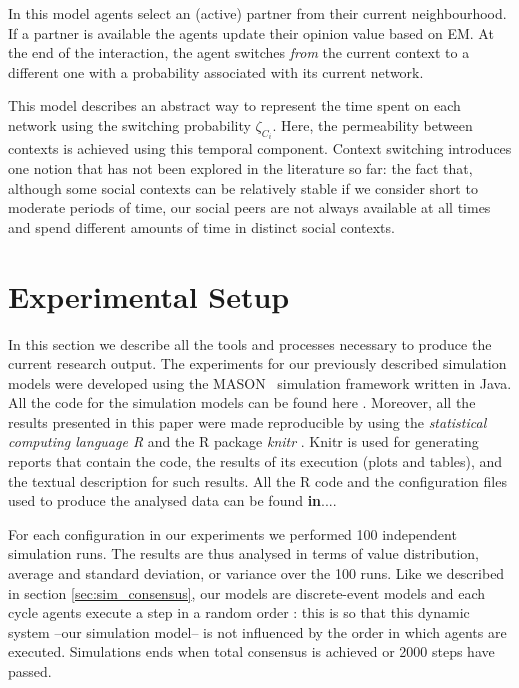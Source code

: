 \documentclass[preprint,number]{elsarticle}
\begin{document}
	\noindent In this model agents select an (active) partner from their current neighbourhood. If a partner is available the agents update their opinion value based on EM. At the end of the interaction, the agent switches \textit{from} the current context to a different one with a probability associated with its current network. 
	
	This model describes an abstract way to represent the time spent on each network using the switching probability $\zeta_{C_i}$. Here, the permeability between contexts is achieved using this temporal component. Context switching introduces one notion that has not been explored in the literature so far: the fact that, although some social contexts can be relatively stable if we consider short to moderate periods of time, our social peers are not always available at all times and spend different amounts of time in distinct social contexts.
	
	\section{Experimental Setup}
	\label{sec:experimental-setup}
	In this section we describe all the tools and processes necessary to produce the current research output. The experiments for our previously described simulation models were developed using the MASON~\cite{Luke2005} simulation framework written in Java. All the code for the simulation models can be found here \cite{Nunes:Software:11067}. Moreover, all the results presented in this paper were made reproducible by using the \textit{statistical computing language R} \cite{R2008} and the R package \textit{knitr} \cite{knitr2014}. Knitr is used for generating reports that contain the code, the results of its execution (plots and tables), and the textual description for such results. All the R code and the configuration files used to produce the analysed data can be found \textbf{in}....

For each configuration in our experiments we performed 100 independent simulation runs. The results are thus analysed in terms of value distribution, average and standard deviation, or variance over the 100 runs. Like we described in section \ref{sec:sim_consensus}, our models are discrete-event models and each cycle agents execute 
a step in a random order : this is so that this dynamic system --our simulation model-- is not influenced by the order in which agents are executed. Simulations ends when total consensus is achieved or 2000 steps have passed.  
\end{document}
